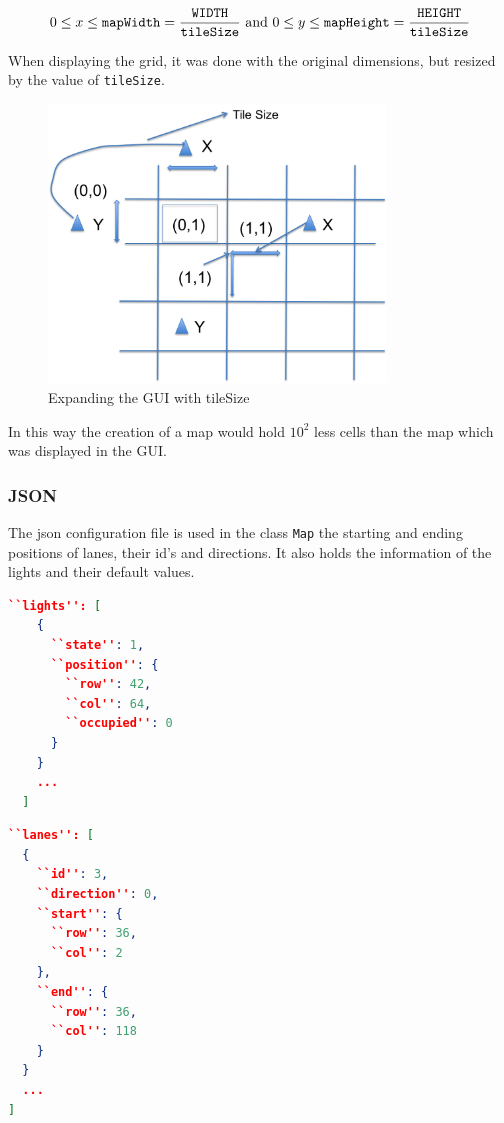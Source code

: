 \begin{equation*}
0 \le x \le \texttt{mapWidth} = \frac{\texttt{WIDTH}}{\texttt{tileSize}}  \textnormal{    and     }  0 \le y \le \texttt{mapHeight} = \frac{\texttt{HEIGHT}}{\texttt{tileSize}}
\end{equation*}

When displaying the grid, it was done with the original dimensions, but resized by the value of \texttt{tileSize}. 
\begin{figure}[H]
    \centering
    \includegraphics[width=0.8\textwidth]{pics/matrix.png}
    \caption{Expanding the GUI with tileSize}
    \label{fig:tileSize}
\end{figure}
In this way the creation of a map would hold $10^{2}$ less cells than the map which was displayed in the GUI. 

\subsubsection{JSON}
\indent  The json configuration file is used in the class \texttt{Map} the starting and ending positions of lanes, their id's and directions. It also holds the information of the lights and their default values. 

\begin{minipage}[b]{0.45\linewidth}
\centering
\begin{lstlisting}[language=json, firstnumber=1]
  ``lights'': [
    {
      ``state'': 1,
      ``position'': {
        ``row'': 42,
        ``col'': 64,
        ``occupied'': 0
      }
    }
    ...
  ]
\end{lstlisting}
\end{minipage}
\hspace{0.5cm}
\begin{minipage}[b]{0.45\linewidth}
\centering
\begin{lstlisting}[language=json, firstnumber=1]
  ``lanes'': [
  {
    ``id'': 3,
    ``direction'': 0,
    ``start'': {
      ``row'': 36,
      ``col'': 2
    },
    ``end'': {
      ``row'': 36,
      ``col'': 118
    }
  }
  ...
]
\end{lstlisting}
\end{minipage}

